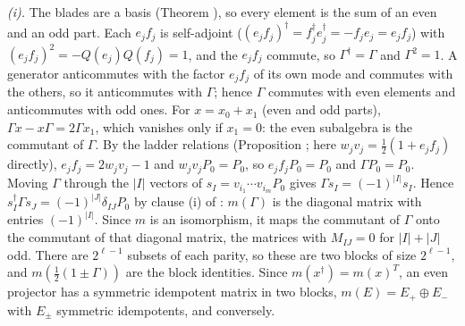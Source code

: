 \emph{(i).} The blades are a basis (Theorem ), so every element is the sum of an even and an odd part. Each $e_{j}f_{j}$ is self-adjoint ($(e_{j}f_{j})^{\dagger} = f_{j}^{\dagger}e_{j}^{\dagger} = -f_{j}e_{j} = e_{j}f_{j}$) with $(e_{j}f_{j})^{2} = -Q(e_{j})Q(f_{j}) = 1$, and the $e_{j}f_{j}$ commute, so $\Gamma^{\dagger} = \Gamma$ and $\Gamma^{2} = 1$. A generator anticommutes with the factor $e_{j}f_{j}$ of its own mode and commutes with the others, so it anticommutes with $\Gamma$; hence $\Gamma$ commutes with even elements and anticommutes with odd ones. For $x = x_{0} + x_{1}$ (even and odd parts), $\Gamma x - x\Gamma = 2\Gamma x_{1}$, which vanishes only if $x_{1} = 0$: the even subalgebra is the commutant of $\Gamma$. By the ladder relations (Proposition ; here $w_{j}v_{j} = \tfrac12(1 + e_{j}f_{j})$ directly), $e_{j}f_{j} = 2w_{j}v_{j} - 1$ and $w_{j}v_{j}P_{0} = P_{0}$, so $e_{j}f_{j}P_{0} = P_{0}$ and $\Gamma P_{0} = P_{0}$. Moving $\Gamma$ through the $|I|$ vectors of $s_{I} = v_{i_{1}}\cdots v_{i_{m}}P_{0}$ gives $\Gamma s_{I} = (-1)^{|I|}s_{I}$. Hence $s_{I}^{\dagger}\Gamma s_{J} = (-1)^{|J|}\delta_{IJ}P_{0}$ by clause (i) of : $m(\Gamma)$ is the diagonal matrix with entries $(-1)^{|I|}$. Since $m$ is an isomorphism, it maps the commutant of $\Gamma$ onto the commutant of that diagonal matrix, the matrices with $M_{IJ} = 0$ for $|I| + |J|$ odd. There are $2^{\ell-1}$ subsets of each parity, so these are two blocks of size $2^{\ell-1}$, and $m(\tfrac12(1 \pm \Gamma))$ are the block identities. Since $m(x^{\dagger}) = m(x)^{T}$, an even projector has a symmetric idempotent matrix in two blocks, $m(E) = E_{+} \oplus E_{-}$ with $E_{\pm}$ symmetric idempotents, and conversely.

